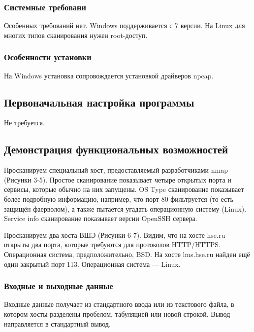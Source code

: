 \subsubsection{Системные требовани}
Особенных требований нет. Windows поддерживается с 7 версии. На Linux для многих типов сканирования нужен root-доступ.

\subsubsection{Особенности установки}
На Windows установка сопровождается установкой драйверов npcap.

\subsection{Первоначальная настройка программы}
Не требуется.

\subsection{Демонстрация функциональных возможностей}
Просканируем специальный хост, предоставляемый разработчиками nmap (Рисунки 3-5). Простое сканирование показывает четыре открытых порта и сервисы, которые обычно на них запущены. OS Type сканирование показывает более подробную информацию, например, что порт 80 фильтруется (то есть защищён фаерволом), а также пытается угадать операционную систему (Linux). Service info сканирование показывает версии OpenSSH сервера.

\FloatBarrier

\FloatBarrier

\FloatBarrier

Просканируем два хоста ВШЭ (Рисунки 6-7). Видим, что на хосте hse.ru открыты два порта, которые требуются для протоколов HTTP/HTTPS. Операционная система, предположительно, BSD. На хосте lms.hse.ru найден ещё один закрытый порт 113. Операционная система — Linux.
\FloatBarrier

\FloatBarrier


\subsubsection{Входные и выходные данные}
Входные данные получает из стандартного ввода или из текстового файла, в котором хосты разделены пробелом, табуляцией или новой строкой. Вывод направляется в стандартный вывод.

